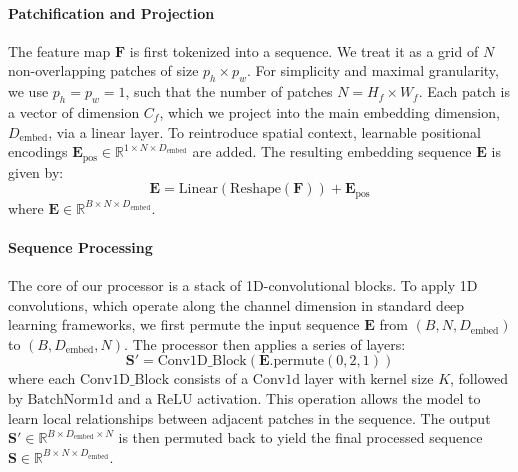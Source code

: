 \documentclass[12pt, a4paper]{article}
\begin{document}
\paragraph{Patchification and Projection}
The feature map $\mathbf{F}$ is first tokenized into a sequence. We treat it as a grid of $N$ non-overlapping patches of size $p_h \times p_w$. For simplicity and maximal granularity, we use $p_h = p_w = 1$, such that the number of patches $N = H_f \times W_f$. Each patch is a vector of dimension $C_f$, which we project into the main embedding dimension, $D_{\text{embed}}$, via a linear layer. To reintroduce spatial context, learnable positional encodings $\mathbf{E}_{\text{pos}} \in \mathbb{R}^{1 \times N \times D_{\text{embed}}}$ are added. The resulting embedding sequence $\mathbf{E}$ is given by:
\begin{equation}
\mathbf{E} = \text{Linear}(\text{Reshape}(\mathbf{F})) + \mathbf{E}_{\text{pos}}
\end{equation}
where $\mathbf{E} \in \mathbb{R}^{B \times N \times D_{\text{embed}}}$.

\paragraph{Sequence Processing}
The core of our processor is a stack of 1D-convolutional blocks. To apply 1D convolutions, which operate along the channel dimension in standard deep learning frameworks, we first permute the input sequence $\mathbf{E}$ from $(B, N, D_{\text{embed}})$ to $(B, D_{\text{embed}}, N)$. The processor then applies a series of layers:
\begin{equation}
\mathbf{S}' = \text{Conv1D\_Block}(\mathbf{E}.\text{permute}(0, 2, 1))
\end{equation}
where each $\text{Conv1D\_Block}$ consists of a $\text{Conv1d}$ layer with kernel size $K$, followed by $\text{BatchNorm1d}$ and a $\text{ReLU}$ activation. This operation allows the model to learn local relationships between adjacent patches in the sequence. The output $\mathbf{S}' \in \mathbb{R}^{B \times D_{\text{embed}} \times N}$ is then permuted back to yield the final processed sequence $\mathbf{S} \in \mathbb{R}^{B \times N \times D_{\text{embed}}}$.
\end{document}
